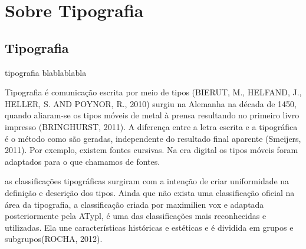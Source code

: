 \chapter{Sobre Tipografia}
\label{ch:Tipografia}

\section{Tipografia}

tipografia blablablabla

Tipografia é comunicação escrita por meio de tipos (BIERUT, M., HELFAND, J., HELLER, S. AND POYNOR, R., 2010) surgiu na Alemanha na década de 1450, quando aliaram-se os tipos móveis de metal à prensa resultando no primeiro livro impresso (BRINGHURST, 2011).  A diferença entre a letra escrita e a tipográfica é o método como são geradas, independente do resultado final aparente (Smeijers, 2011). Por exemplo, existem fontes cursivas. Na era digital os tipos móveis foram adaptados para o que chamamos de fontes.


as classificações tipográficas surgiram com a intenção de  criar uniformidade na definição e descrição dos tipos. Ainda que não exista uma classificação oficial na área da tipografia, a classificação criada por maximilien vox e adaptada posteriormente pela ATypl, é uma das classificações mais reconhecidas e utilizadas. Ela une características históricas e estéticas e é dividida em grupos e subgrupos(ROCHA, 2012).
